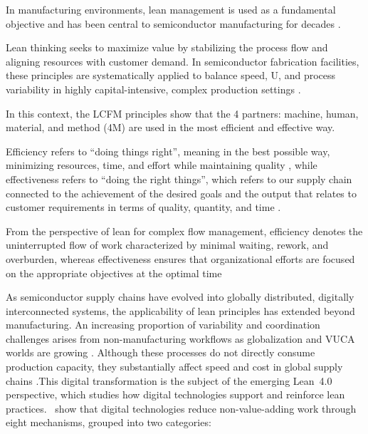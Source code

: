 \documentclass[preprint,12pt,authoryear]{elsarticle}
\begin{document}
In manufacturing environments, lean management is used as a fundamental objective and has been central to semiconductor manufacturing for decades \citep{Liker2004}. 

Lean thinking seeks to maximize value by stabilizing the process flow and aligning resources with customer demand. In semiconductor fabrication facilities, these principles are systematically applied to balance speed, U, and process variability in highly capital-intensive, complex production settings \citep{Liker2004}.

In this context, the LCFM principles \citep{bauer2011LCFM} show that the 4 partners: machine, human, material, and method (4M) \citep{Schmielau2024} are used in the most efficient and effective way.

Efficiency refers to ``doing things right'', meaning in the best possible way, minimizing resources, time, and effort while maintaining quality \citep{Liker2004}, while effectiveness refers to ``doing the right things'', which refers to our supply chain connected to the achievement of the desired goals and the output that relates to customer requirements in terms of quality, quantity, and time \citep{Liker2004}.

From the perspective of lean for complex flow management, efficiency denotes the uninterrupted flow of work characterized by minimal waiting, rework, and overburden, whereas effectiveness ensures that organizational efforts are focused on the appropriate objectives at the optimal time %

As semiconductor supply chains have evolved into globally distributed, digitally interconnected systems, the applicability of lean principles has extended beyond manufacturing. An increasing proportion of variability and coordination challenges arises from non-manufacturing workflows as globalization and VUCA worlds are growing \citep{SchusterStork2021}. Although these processes do not directly consume production capacity, they substantially affect speed and cost in global supply chains \citep{hopp2001}.This digital transformation is the subject of the emerging Lean~4.0
perspective, which studies how digital technologies support and reinforce lean practices.\ \citet{cifone2021lean40} show that digital technologies
reduce non-value-adding work through eight mechanisms, grouped into two
categories:
\end{document}
